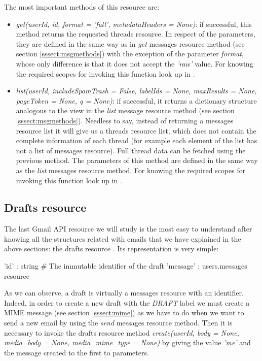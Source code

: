 The most important methods of this resource are:
\begin{itemize}
	\item\textit{get(userId, id, format = 'full', metadataHeaders = None)}: if successful, this method returns the requested threads resource. In respect of the parameters, they are defined in the same way as in \textit{get} messages resource method (see section \ref{sssect:msgmethods}) with the exception of the parameter \textit{format}, whose only difference is that it does not accept the \textit{'raw'} value. For knowing the required scopes for invoking this function look up in \cite[/v1/reference/users/threads/get]{gmailAPI}.
	\item\textit{list(userId, includeSpamTrash = False, labelIds = None, maxResults = None, pageToken = None, q = None)}: if successful, it returns a dictionary structure analogous to the view in the \textit{list} message resource method (see section \ref{sssect:msgmethods}). Needless to say, instead of returning a messages resource list it will give us a threads resource list, which does not contain the complete information of each thread (for example each element of the list has not a list of messages resource). Full thread data can be fetched using the previous method. The parameters of this method are defined in the same way as the \textit{list} messages resource method. For knowing the required scopes for invoking this function look up in \cite[/v1/reference/users/threads/list]{gmailAPI}.
\end{itemize}

\subsection{Drafts resource}\label{ssect:drafts}
The last Gmail API resource we will study is the most easy to understand after knowing all the structures related with emails that we have explained in the above sections: the drafts resource \citep[/v1/reference/users/drafts]{gmailAPI}. Its representation is very simple:

\begin{python}
	{
		'id' : string # The immutable identifier of the draft
		'message' : users.messages resource
	}
\end{python}

As we can observe, a draft is virtually a messages resource with an identifier. Indeed, in order to create a new draft with the \textit{DRAFT} label we must create a MIME message (see section \ref{sssect:mime}) as we have to do when we want to send a new email by using the \textit{send} messages resource method. Then it is necessary to invoke the drafts resource method \textit{create(userId, body = None, media\_body = None, media\_mime\_type = None)} by giving the value \textit{'me'} and the message created to the first to parameters.


